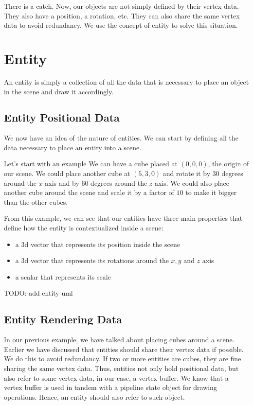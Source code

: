 There is a catch.
Now, our objects are not simply defined by their vertex data.
They also have a position, a rotation, etc.
They can also share the same vertex data to avoid redundancy.
We use the concept of entity to solve this situation.

\section{Entity}

An entity is simply a collection of all the data that is necessary to place
an object in the scene and draw it accordingly.

\subsection{Entity Positional Data}

We now have an idea of the nature of entities.
We can start by defining all the data necessary
to place an entity into a scene.

Let's start with an example
We can have a cube placed at $(0, 0, 0)$, the origin of our scene.
We could place another cube at $(5, 3, 0)$ and rotate it by $30$
degrees around the $x$ axis and by $60$ degrees around the $z$ axis.
We could also place another cube around the scene and scale it by a factor
of $10$ to make it bigger than the other cubes.

From this example, we can see that our entities have three main properties
that define how the entity is contextualized inside a scene:
\begin{itemize}
    \item a 3d vector that represents its position inside the scene
    \item a 3d vector that represents its rotations around the $x, y$ and $z$ axis
    \item a scalar that represents its scale
\end{itemize}

TODO: add entity uml

\subsection{Entity Rendering Data}

In our previous example, we have talked about placing cubes around a scene.
Earlier we have discussed that entities should share their vertex data if possible.
We do this to avoid redundancy.
If two or more entities are cubes, they are fine sharing the same vertex data.
Thus, entities not only hold positional data, but also refer to some vertex data,
in our case, a vertex buffer.
We know that a vertex buffer is used in tandem with a pipeline state object for
drawing operations.
Hence, an entity should also refer to such object.

